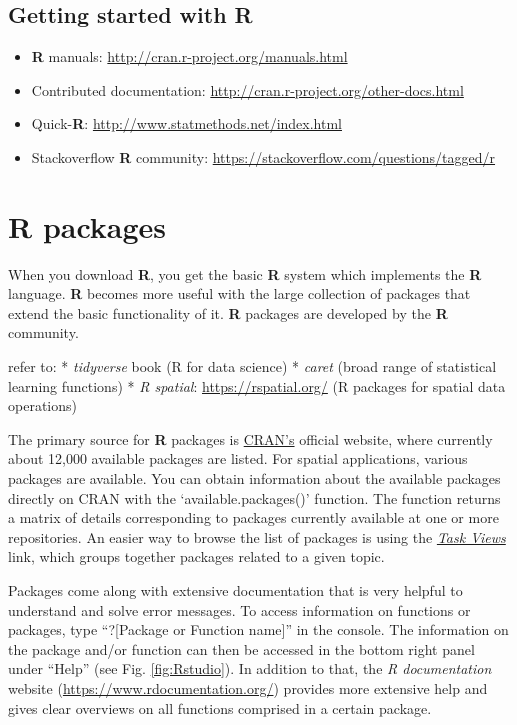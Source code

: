 \documentclass[
  10pt,
  b5paper,
  oneside]{book}
\providecommand{\tightlist}{%
  \setlength{\itemsep}{0pt}\setlength{\parskip}{0pt}}
\begin{document}
\hypertarget{getting-started-with-r}{%
\subsection{Getting started with R}\label{getting-started-with-r}}

\begin{itemize}
\tightlist
\item
  \textbf{R} manuals: \url{http://cran.r-project.org/manuals.html}
\item
  Contributed documentation: \url{http://cran.r-project.org/other-docs.html}
\item
  Quick-\textbf{R}: \url{http://www.statmethods.net/index.html}
\item
  Stackoverflow \textbf{R} community: \url{https://stackoverflow.com/questions/tagged/r}
\end{itemize}

\hypertarget{r-packages}{%
\section{R packages}\label{r-packages}}

When you download \textbf{R}, you get the basic \textbf{R} system which implements the \textbf{R} language. \textbf{R} becomes more useful with the large collection of packages that extend the basic functionality of it. \textbf{R} packages are developed by the \textbf{R} community.

refer to:
* \emph{tidyverse} book (R for data science)
* \emph{caret} (broad range of statistical learning functions)
* \emph{R spatial}: \url{https://rspatial.org/} (R packages for spatial data operations)

The primary source for \textbf{R} packages is \href{https://cran.r-project.org/}{CRAN's} official website, where currently about 12,000 available packages are listed. For spatial applications, various packages are available. You can obtain information about the available packages directly on CRAN with the `available.packages()' function. The function returns a matrix of details corresponding to packages currently available at one or more repositories. An easier way to browse the list of packages is using the \href{https://cran.r-project.org/web/views/}{\emph{Task Views}} link, which groups together packages related to a given topic.

Packages come along with extensive documentation that is very helpful to understand and solve error messages. To access information on functions or packages, type ``?{[}Package or Function name{]}'' in the console. The information on the package and/or function can then be accessed in the bottom right panel under ``Help'' (see Fig. \ref{fig:Rstudio}). In addition to that, the \emph{R documentation} website (\url{https://www.rdocumentation.org/}) provides more extensive help and gives clear overviews on all functions comprised in a certain package.
\end{document}
